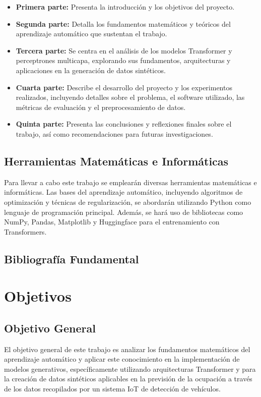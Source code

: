 \begin{itemize}
    \item \textbf{Primera parte:} Presenta la introducción y los objetivos del
    proyecto. 
    \item \textbf{Segunda parte:} Detalla los fundamentos matemáticos
    y teóricos del aprendizaje automático que sustentan el trabajo. 
    \item \textbf{Tercera parte:} Se centra en el análisis de los modelos Transformer
    y perceptrones multicapa, explorando sus fundamentos, arquitecturas y
    aplicaciones en la generación de datos sintéticos.
    \item \textbf{Cuarta parte:} Describe el desarrollo del proyecto y los
    experimentos realizados, incluyendo detalles sobre el problema, el software
    utilizado, las métricas de evaluación y el preprocesamiento de datos. 
    \item \textbf{Quinta parte:} Presenta las conclusiones y reflexiones finales sobre
    el trabajo, así como recomendaciones para futuras investigaciones.
\end{itemize}

\subsection{Herramientas Matemáticas e Informáticas}
Para llevar a cabo este trabajo se emplearán diversas herramientas matemáticas e
informáticas. Las bases del aprendizaje automático, incluyendo algoritmos de
optimización y técnicas de regularización, se abordarán utilizando Python como
lenguaje de programación principal. Además, se hará uso de bibliotecas como NumPy,
Pandas, Matplotlib y Huggingface para el entrenamiento con Transformers.

\subsection{Bibliografía Fundamental}

\section{Objetivos}

\subsection{Objetivo General}
El objetivo general de este trabajo es analizar los fundamentos matemáticos del
aprendizaje automático y aplicar este conocimiento en la implementación de
modelos generativos, específicamente utilizando arquitecturas Transformer y
para la creación de datos sintéticos aplicables en la previsión de la ocupación a
través de los datos recopilados por un sistema IoT de detección de vehículos.

